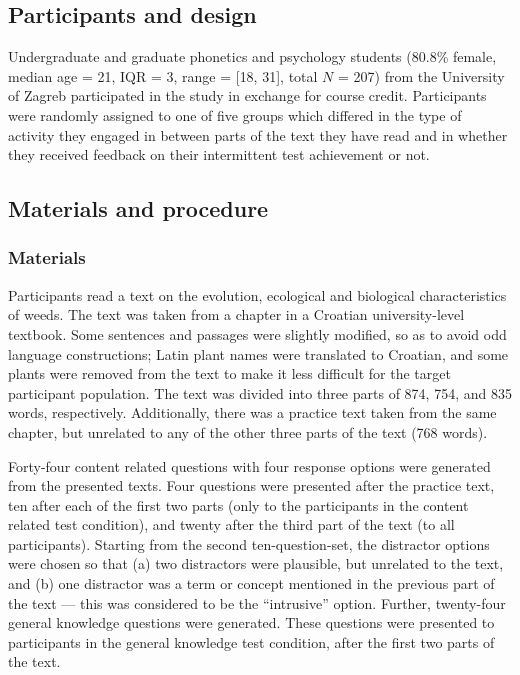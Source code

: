 \documentclass[11pt,]{article}
\title{}
\author{}
\date{}
\begin{document}
\hypertarget{participants-and-design}{%
\subsection{Participants and design}\label{participants-and-design}}

Undergraduate and graduate phonetics and psychology students (80.8\%
female, median age = 21, IQR = 3, range = {[}18, 31{]}, total \(N\) =
207) from the University of Zagreb participated in the study in exchange
for course credit. Participants were randomly assigned to one of five
groups which differed in the type of activity they engaged in between
parts of the text they have read and in whether they received feedback
on their intermittent test achievement or not.

\hypertarget{materials-and-procedure}{%
\subsection{Materials and procedure}\label{materials-and-procedure}}

\hypertarget{materials}{%
\subsubsection{Materials}\label{materials}}

Participants read a text on the evolution, ecological and biological
characteristics of weeds. The text was taken from a chapter in a
Croatian university-level textbook. Some sentences and passages were
slightly modified, so as to avoid odd language constructions; Latin
plant names were translated to Croatian, and some plants were removed
from the text to make it less difficult for the target participant
population. The text was divided into three parts of 874, 754, and 835
words, respectively. Additionally, there was a practice text taken from
the same chapter, but unrelated to any of the other three parts of the
text (768 words).

Forty-four content related questions with four response options were
generated from the presented texts. Four questions were presented after
the practice text, ten after each of the first two parts (only to the
participants in the content related test condition), and twenty after
the third part of the text (to all participants). Starting from the
second ten-question-set, the distractor options were chosen so that (a)
two distractors were plausible, but unrelated to the text, and (b) one
distractor was a term or concept mentioned in the previous part of the
text --- this was considered to be the ``intrusive'' option. Further,
twenty-four general knowledge questions were generated. These questions
were presented to participants in the general knowledge test condition,
after the first two parts of the text.
\end{document}
